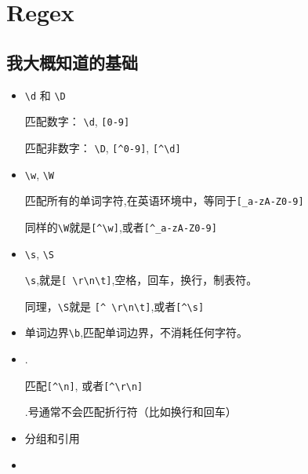 \chapter{Regex}


\section{我大概知道的基础}

\begin{itemize}
\item \lstinline$\d$ 和 \lstinline$\D$

匹配数字： \lstinline$\d$, \lstinline$[0-9]$

匹配非数字： \lstinline$\D$, \lstinline$[^0-9]$, \lstinline$[^\d]$

\item \lstinline$\w$, \lstinline$\W$

匹配所有的单词字符,在英语环境中，等同于\lstinline$[_a-zA-Z0-9]$

同样的\lstinline$\W$就是\lstinline$[^\w]$,或者\lstinline$[^_a-zA-Z0-9]$

\item \lstinline$\s$, \lstinline$\S$

\lstinline$\s$,就是\lstinline$[ \r\n\t]$,空格，回车，换行，制表符。

同理，\lstinline$\S$就是 \lstinline$[^ \r\n\t]$,或者\lstinline$[^\s]$

\item 单词边界\lstinline$\b$,匹配单词边界，不消耗任何字符。

\item .

匹配\lstinline$[^\n]$, 或者\lstinline$[^\r\n]$

.号通常不会匹配折行符（比如换行和回车）

\item 分组和引用

\item 

\end{itemize}